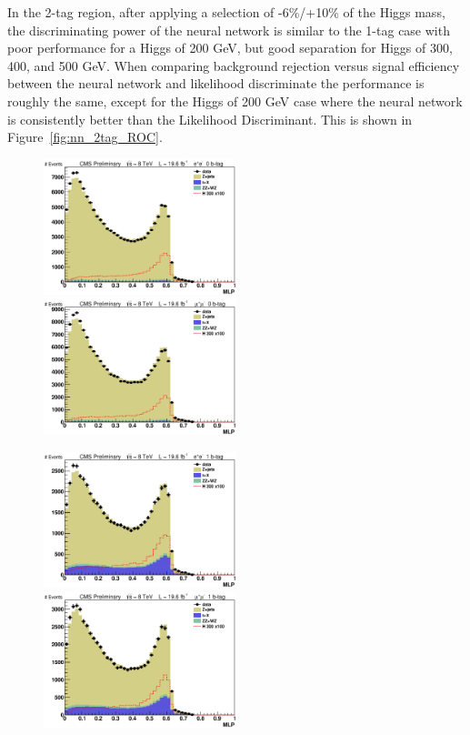 In the 2-tag region, after applying a selection of -6\%/+10\% of the Higgs mass, the discriminating power of the neural network is similar to the 1-tag case with poor performance for a Higgs of 200 GeV, but good separation for Higgs of 300, 400, and 500 GeV.  When comparing background rejection versus signal efficiency between the neural network and likelihood discriminate the performance is roughly the same, except for the Higgs of 200 GeV case where the neural network is consistently better than the Likelihood Discriminant. This is shown in Figure~\ref{fig:nn_2tag_ROC}.


\begin{figure}[htb!]
  \centerline{
    \includegraphics[width=0.5\textwidth]{presentation/defense/images/preselection/0/el/MLP.eps}
    \includegraphics[width=0.5\textwidth]{presentation/defense/images/preselection/0/mu/MLP.eps}
  }
  \centerline{
    \includegraphics[width=0.5\textwidth]{presentation/defense/images/preselection/1/el/MLP.eps}
    \includegraphics[width=0.5\textwidth]{presentation/defense/images/preselection/1/mu/MLP.eps}
}
\end{figure}

